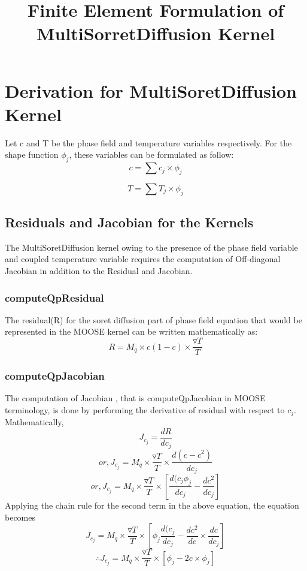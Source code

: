 \documentclass[10pt,a4paper]{article}
\begin{document}
\title{Finite Element Formulation of MultiSorretDiffusion Kernel}
\section{Derivation for MultiSoretDiffusion Kernel}
 Let c and T be the phase field and temperature variables respectively. For the shape function $ \phi_j$, these variables can be formulated as follow:
 \begin{equation}
 c = \sum c_j \times \phi_j
 \end{equation}
 
 \begin{equation}
 T = \sum T_j \times \phi_j
 \end{equation}
 \subsection{Residuals and Jacobian for the Kernels}
 The MultiSoretDiffusion kernel owing to the presence of the phase field variable and coupled temperature variable requires the computation of Off-diagonal Jacobian in addition to the Residual and Jacobian.
 \subsubsection{computeQpResidual}
 The residual(R) for the soret diffusion part of phase field equation that would be represented in the MOOSE kernel can be written mathematically as:
 \begin{equation}
 R = M_q \times c (1-c) \times \frac{\triangledown T}{T}
 \end{equation}
 \subsubsection{computeQpJacobian}
  The computation of Jacobian , that is computeQpJacobian in MOOSE terminology, is done by performing the derivative of residual with respect to $c_j$. Mathematically,
  \begin{equation}
  J_{c_j} = \frac{dR}{dc_j}
  \end{equation}
  \begin{displaymath}
      or, J_{c_j} = M_q \times \frac{\triangledown T}{T} \times \frac{d(c-c^2)}{dc_j} 
 \end{displaymath}
 \begin{displaymath}
 or, J_{c_j} = M_q \times \frac{\triangledown T}{T} \times [\frac{d(c_j \phi_j}{dc_j} - \frac{dc^2}{dc_j}]
  \end{displaymath} 
  Applying the chain rule for the second term in the above equation, the equation becomes
  \begin{displaymath}
    J_{c_j} = M_q \times \frac{\triangledown T}{T} \times [\phi_j \frac{d(c_j }{dc_j} - \frac{dc^2}{dc} \times \frac{dc}{dc_j}]
\end{displaymath}  
\begin{equation}
\therefore J_{c_j} = M_q \times \frac{\triangledown T}{T} \times [\phi_j  - 2c \times \phi_j] 
\end{equation} 
\end{document}
